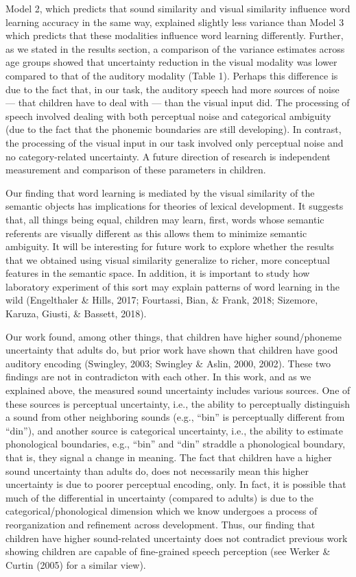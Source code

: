 \documentclass[english,,man]{apa6}
\begin{document}
Model 2, which predicts that sound similarity and visual similarity influence word learning accuracy in the same way, explained slightly less variance than Model 3 which predicts that these modalities influence word learning differently. Further, as we stated in the results section, a comparison of the variance estimates across age groups showed that uncertainty reduction in the visual modality was lower compared to that of the auditory modality (Table 1). Perhaps this difference is due to the fact that, in our task, the auditory speech had more sources of noise --- that children have to deal with --- than the visual input did. The processing of speech involved dealing with both perceptual noise and categorical ambiguity (due to the fact that the phonemic boundaries are still developing). In contrast, the processing of the visual input in our task involved only perceptual noise and no category-related uncertainty. A future direction of research is independent measurement and comparison of these parameters in children.

Our finding that word learning is mediated by the visual similarity of the semantic objects has implications for theories of lexical development. It suggests that, all things being equal, children may learn, first, words whose semantic referents are visually different as this allows them to minimize semantic ambiguity. It will be interesting for future work to explore whether the results that we obtained using visual similarity generalize to richer, more conceptual features in the semantic space. In addition, it is important to study how laboratory experiment of this sort may explain patterns of word learning in the wild (Engelthaler \& Hills, 2017; Fourtassi, Bian, \& Frank, 2018; Sizemore, Karuza, Giusti, \& Bassett, 2018).

Our work found, among other things, that children have higher sound/phoneme uncertainty that adults do, but prior work have shown that children have good auditory encoding (Swingley, 2003; Swingley \& Aslin, 2000, 2002). These two findings are not in contradicton with each other. In this work, and as we explained above, the measured sound uncertainty includes various sources. One of these sources is perceptual uncertainty, i.e., the ability to perceptually distinguish a sound from other neighboring sounds (e.g., \enquote{bin} is perceptually different from \enquote{din}), and another source is categorical uncertainty, i.e., the ability to estimate phonological boundaries, e.g., \enquote{bin} and \enquote{din} straddle a phonological boundary, that is, they signal a change in meaning. The fact that children have a higher sound uncertainty than adults do, does not necessarily mean this higher uncertainty is due to poorer perceptual encoding, only. In fact, it is possible that much of the differential in uncertainty (compared to adults) is due to the categorical/phonological dimension which we know undergoes a process of reorganization and refinement across development. Thus, our finding that children have higher sound-related uncertainty does not contradict previous work showing children are capable of fine-grained speech perception (see Werker \& Curtin (2005) for a similar view).
\end{document}
